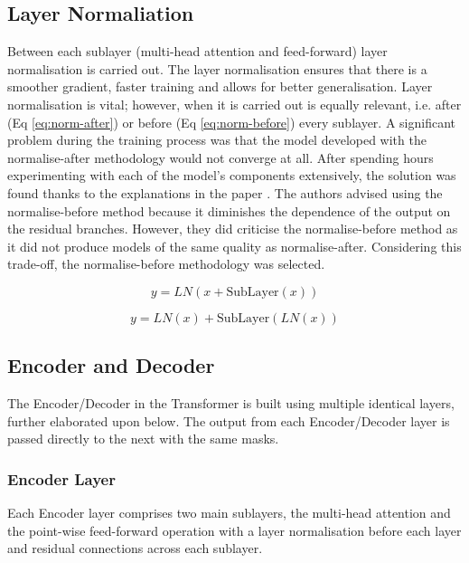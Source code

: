 \documentclass[12pt,a4paper,twoside,openright]{report}
\begin{document}
\subsection{Layer Normaliation}
\label{layer-norm}
Between each sublayer (multi-head attention and feed-forward) layer normalisation is carried out. The layer normalisation ensures that there is a smoother gradient, faster training and allows for better generalisation. 
Layer normalisation is vital; however, when it is carried out is equally relevant, i.e. after (Eq \ref{eq:norm-after}) or  before (Eq \ref{eq:norm-before}) every sublayer. A significant problem during the training process was that the model developed with the normalise-after methodology would not converge at all. After spending hours experimenting with each of the model's components extensively, the solution was found thanks to the explanations in the paper \cite{layernorm}. The authors advised using the normalise-before method because it diminishes the dependence of the output on the residual branches. However, they did criticise the normalise-before method as it did not produce models of the same quality as normalise-after. Considering this trade-off, the normalise-before methodology was selected. 

\begin{equation}
    y = LN(x + \text{SubLayer}(x))
    \label{eq:norm-after}
\end{equation}

\begin{equation}
    y = LN(x) + \text{SubLayer}(LN(x))
    \label{eq:norm-before}
\end{equation}

\subsection{Encoder and Decoder}
\label{enc-dec}

The Encoder/Decoder in the Transformer is built using multiple identical layers, further elaborated upon below. The output from each Encoder/Decoder layer is passed directly to the next with the same masks. 

\subsubsection{Encoder Layer}
Each Encoder layer comprises two main sublayers, the multi-head attention and the point-wise feed-forward operation with a layer normalisation before each layer and residual connections across each sublayer. 
\end{document}
